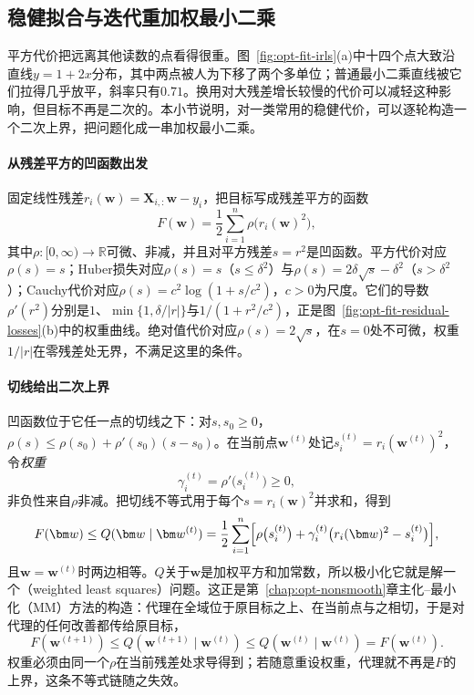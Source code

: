 \subsection{稳健拟合与迭代重加权最小二乘}
\label{sec:opt-fit-irls}

平方代价把远离其他读数的点看得很重。图~\ref{fig:opt-fit-irls}(a)中十四个点大致沿直线$y=1+2x$分布，其中两点被人为下移了两个多单位；普通最小二乘直线被它们拉得几乎放平，斜率只有$0.71$。换用对大残差增长较慢的代价可以减轻这种影响，但目标不再是二次的。本小节说明，对一类常用的稳健代价，可以逐轮构造一个二次上界，把问题化成一串加权最小二乘。

\paragraph{从残差平方的凹函数出发}
固定线性残差$r_i(\bm w)=\bm X_{i,:}\bm w-y_i$，把目标写成残差平方的函数
\begin{equation}
  F(\bm w)=\frac12\sum_{i=1}^n\rho\bigl(r_i(\bm w)^2\bigr),
  \label{eq:opt-fit-robust-objective}
\end{equation}
其中$\rho:[0,\infty)\to\mathbb R$可微、非减，并且对平方残差$s=r^2$是凹函数。平方代价对应$\rho(s)=s$；Huber损失对应$\rho(s)=s$（$s\le\delta^2$）与$\rho(s)=2\delta\sqrt s-\delta^2$（$s>\delta^2$）；Cauchy代价对应$\rho(s)=c^2\log(1+s/c^2)$，$c>0$为尺度。它们的导数$\rho'(r^2)$分别是$1$、$\min\{1,\delta/|r|\}$与$1/(1+r^2/c^2)$，正是图~\ref{fig:opt-fit-residual-losses}(b)中的权重曲线。绝对值代价对应$\rho(s)=2\sqrt s$，在$s=0$处不可微，权重$1/|r|$在零残差处无界，不满足这里的条件。

\paragraph{切线给出二次上界}
凹函数位于它任一点的切线之下：对$s,s_0\ge0$，$\rho(s)\le\rho(s_0)+\rho'(s_0)(s-s_0)$。在当前点$\bm w^{(t)}$处记$s_i^{(t)}=r_i(\bm w^{(t)})^2$，令\emph{权重}
\[
  \gamma_i^{(t)}=\rho'\bigl(s_i^{(t)}\bigr)\ge0,
\]
非负性来自$\rho$非减。把切线不等式用于每个$s=r_i(\bm w)^2$并求和，得到
\begin{equation}
  F(\bm w)\le Q(\bm w\mid\bm w^{(t)})
  =\frac12\sum_{i=1}^n\Bigl[\rho\bigl(s_i^{(t)}\bigr)+\gamma_i^{(t)}\bigl(r_i(\bm w)^2-s_i^{(t)}\bigr)\Bigr],
  \label{eq:opt-fit-irls-surrogate}
\end{equation}
且$\bm w=\bm w^{(t)}$时两边相等。$Q$关于$\bm w$是加权平方和加常数，所以极小化它就是解一个（weighted least squares）问题。这正是第~\ref{chap:opt-nonsmooth}章主化--最小化（MM）方法的构造：代理在全域位于原目标之上、在当前点与之相切，于是对代理的任何改善都传给原目标，
\[
  F(\bm w^{(t+1)})\le Q(\bm w^{(t+1)}\mid\bm w^{(t)})\le Q(\bm w^{(t)}\mid\bm w^{(t)})=F(\bm w^{(t)}).
\]
权重必须由同一个$\rho$在当前残差处求导得到；若随意重设权重，代理就不再是$F$的上界，这条不等式链随之失效。

